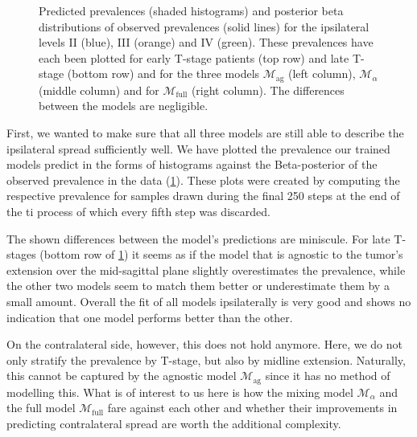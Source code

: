 \documentclass[\relativeRoot/main.tex]{subfiles}
\begin{document}
\begin{figure}
    \def\svgwidth{1.0\textwidth}
    
    \caption[Comparison of ipsilateral prevalences]{
        Predicted prevalences (shaded histograms) and posterior beta distributions of observed prevalences (solid lines) for the ipsilateral levels II (blue), III (orange) and IV (green). These prevalences have each been plotted for early T-stage patients (top row) and late T-stage (bottom row) and for the three models $\mathcal{M}_\text{ag}$ (left column), $\mathcal{M}_\alpha$ (middle column) and for $\mathcal{M}_\text{full}$ (right column). The differences between the models are negligible.
    }
    \label{fig:bilateral:model_comp:ipsi}
\end{figure}

First, we wanted to make sure that all three models are still able to describe the ipsilateral spread sufficiently well. We have plotted the prevalence our trained models predict in the forms of histograms against the Beta-posterior of the observed prevalence in the data (\cref{fig:bilateral:model_comp:ipsi}). These plots were created by computing the respective prevalence for samples drawn during the final 250 steps at the end of the \gls{ti} process of which every fifth step was discarded.

The shown differences between the model's predictions are miniscule. For late T-stages (bottom row of \cref{fig:bilateral:model_comp:ipsi}) it seems as if the model that is agnostic to the tumor's extension over the mid-sagittal plane slightly overestimates the prevalence, while the other two models seem to match them better or underestimate them by a small amount. Overall the fit of all models ipsilaterally is very good and shows no indication that one model performs better than the other.

On the contralateral side, however, this does not hold anymore. Here, we do not only stratify the prevalence by T-stage, but also by midline extension. Naturally, this cannot be captured by the agnostic model $\mathcal{M}_\text{ag}$ since it has no method of modelling this. What is of interest to us here is how the mixing model $\mathcal{M}_\alpha$ and the full model $\mathcal{M}_\text{full}$ fare against each other and whether their improvements in predicting contralateral spread are worth the additional complexity.
\end{document}
